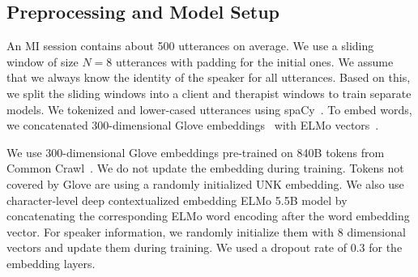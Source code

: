 
\subsection{Preprocessing and Model Setup}
\label{ssec:snt:exp_setup}


An MI session contains about 500 utterances on average. We use a
sliding window of size $N=8$ utterances with padding for the initial
ones. We assume that we always know the identity of the speaker for
all utterances. Based on this, we split the sliding windows into a
client and therapist windows to train separate models.
%
We tokenized and lower-cased utterances using
spaCy~\cite{spacy2}. To embed words, we concatenated 300-dimensional
Glove embeddings~\cite{pennington2014glove} with ELMo
vectors~\cite{Peters:2018}.

We use 300-dimensional Glove embeddings pre-trained on 840B tokens
from Common Crawl~\cite{pennington2014glove}. We do not update the
embedding during training. Tokens not covered by Glove are using a
randomly initialized UNK embedding. We also use character-level deep
contextualized embedding ELMo 5.5B model by concatenating the
corresponding ELMo word encoding after the word embedding vector. For
speaker information, we randomly initialize them with 8 dimensional
vectors and update them during training. We used a dropout rate of 0.3
for the embedding layers.

